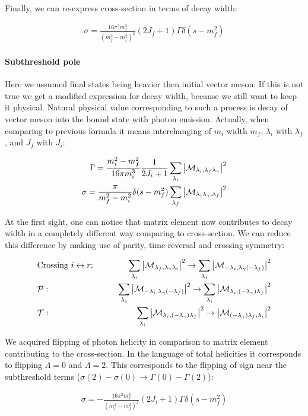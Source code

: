 Finally, we can re-express cross-section in terms of decay width:

\begin{align} \label{eq:app:crsc-dw}
    \sigma = \frac{16 \pi^2 m_f^3}{(m_f^2 - m_i^2)^2} (2J_f + 1) \Gamma \delta(s - m_f^2)
\end{align}

\paragraph{Subthreshold pole} Here we assumed final states being heavier then initial vector meson. If this is not true we get a modified expression for decay width, because we still want to keep it physical. Natural physical value corresponding to such a process is decay of vector meson into the bound state with photon emission. Actually, when comparing to previous formula it means interchanging of $m_i$ width $m_f$, $\lambda_i$ with $\lambda_f$, and $J_f$ with $J_i$:

\begin{align}
        \Gamma = \frac{m_i^2 - m_f^2}{16 \pi m_i^3} \frac{1}{2J_i + 1} \sum_{\lambda_i} \abs{\mathcal{M}_{\lambda_i, \lambda_f \lambda_\gamma}}^2 \\
        \sigma = \frac{\pi}{m_f^2 - m_i^2} \delta(s - m_f^2) \sum_{\lambda_f} \abs{\mathcal{M}_{\lambda_i \lambda_\gamma, \lambda_f}}^2
\end{align}

At the first sight, one can notice that matrix element now contributes to decay width in a completely different way comparing to cross-section. We can reduce this difference by making use of parity, time reversal and crossing symmetry:

\begin{align}
    &\text{Crossing $i \leftrightarrow r$:}\qquad &\sum_{\lambda_i} \abs{\mathcal{M}_{\lambda_f, \lambda_\gamma \lambda_i}}^2 \rightarrow \sum_{\lambda_i} \abs{\mathcal{M}_{-\lambda_i, \lambda_\gamma (-\lambda_f)}}^2 \\
    &\mathcal{P}:\qquad &\sum_{\lambda_i} \abs{\mathcal{M}_{-\lambda_i, \lambda_\gamma (-\lambda_f)}}^2 \rightarrow \sum_{\lambda_i} \abs{\mathcal{M}_{\lambda_i, (-\lambda_\gamma) \lambda_f}}^2\\
    &\mathcal{T}:\qquad &\sum_{\lambda_i} \abs{\mathcal{M}_{\lambda_i, (-\lambda_\gamma) \lambda_f}}^2 \rightarrow \abs{\mathcal{M}_{(-\lambda_\gamma) \lambda_f, \lambda_i}}^2
\end{align}

We acquired flipping of photon helicity in comparison to matrix element contributing to the cross-section. In the language of total helicities it corresponds to flipping $\Lambda=0$ and $\Lambda=2$. This corresponds to the flipping of sign near the subthreshold terms ($\sigma(2) - \sigma(0) \rightarrow \Gamma(0) - \Gamma(2)$):

\begin{align} \label{eq:app:crsc-dw-subthr}
    \sigma = -\frac{16 \pi^2 m_f^3}{(m_i^2 - m_f^2)^2} (2J_i + 1) \Gamma \delta(s - m_f^2)
\end{align}
